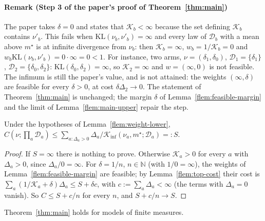 \documentclass[11pt]{article}
\newcommand{\KL}{\mathrm{KL}}
\newcommand{\Kinf}{\mathcal{K}_{\inf}}
\newcommand{\ms}{m^{\star}}
\newcommand{\GL}{C}
\newcommand{\gap}{\Delta}
\begin{document}
\paragraph{Remark (Step 3 of the paper's proof of Theorem~\ref{thm:main})} The paper takes
$\delta=0$ and states that $\mathcal K_b<\infty$ because the set defining $\mathcal K_b$ contains
$\nu'_b$. This fails when $\KL(\nu_b,\nu'_b)=\infty$ and every law of $\mathcal D_b$ with a mean
above $\ms$ is at infinite divergence from $\nu_b$: then $\mathcal K_b=\infty$, $w_b=1/\mathcal
K_b=0$ and $w_b\KL(\nu_b,\nu'_b)=0\cdot\infty=0<1$. For instance, two arms, $\nu=(\delta_1,\delta_0)$,
$\mathcal D_1=\{\delta_1\}$, $\mathcal D_2=\{\delta_0,\delta_2\}$: $\KL(\delta_0,\delta_2)=\infty$,
so $\mathcal K_2=\infty$ and $w=(\infty,0)$ is not feasible. The infimum is still the paper's value,
and is not attained: the weights $(\infty,\delta)$ are feasible for every $\delta>0$, at cost
$\delta\gap_2\to0$. The statement of Theorem~\ref{thm:main} is unchanged; the margin $\delta$ of
Lemma~\ref{flem:feasible-margin} and the limit of Lemma~\ref{flem:main-upper} repair the step.

\begin{lemma}\label{flem:main-upper}
Under the hypotheses of Lemma~\ref{flem:weight-lower},
$\GL(\nu;\prod_a\mathcal D_a)\le\sum_{a:\gap_a>0}\gap_a/\Kinf(\nu_a,\ms;\mathcal D_a)=:S$.
\end{lemma}

\begin{proof}
If $S=\infty$ there is nothing to prove. Otherwise $\mathcal K_a>0$ for every $a$ with $\gap_a>0$,
since $\gap_a/0=\infty$. For $\delta=1/n$, $n\in\mathbb N$ (with $1/0=\infty$), the weights of
Lemma~\ref{flem:feasible-margin} are feasible; by Lemma~\ref{flem:top-cost} their cost is
$\sum_a(1/\mathcal K_a+\delta)\gap_a\le S+\delta c$, with $c:=\sum_a\gap_a<\infty$ (the terms with
$\gap_a=0$ vanish). So $\GL\le S+c/n$ for every $n$, and $S+c/n\to S$.
\end{proof}

\begin{lemma}\label{flem:main}
Theorem~\ref{thm:main} holds for models of finite measures.
\end{lemma}
\end{document}
